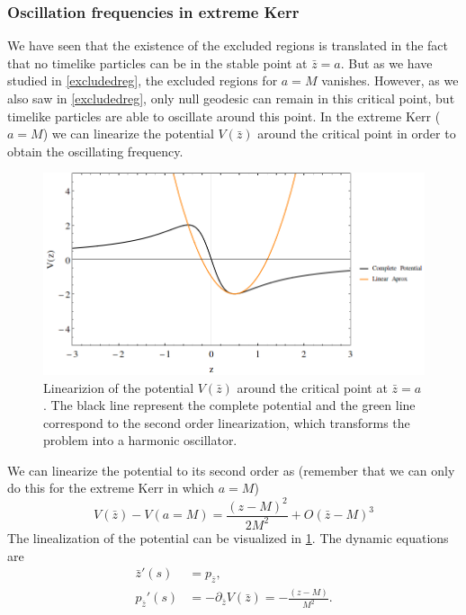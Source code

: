 \subsubsection{Oscillation frequencies in extreme Kerr}
\FloatBarrier
We have seen that the existence of the excluded regions is translated in the fact that no timelike particles can be in the stable point at $\bar z=a$. But as we have studied in \cref{excludedreg}, the excluded regions for $a=M$ vanishes. However, as we also saw in \cref{excludedreg}, only null geodesic can remain in this critical point, but timelike particles are able to oscillate around this point. In the extreme Kerr ($a=M$) we can linearize the potential $V(\bar z)$ around the critical point in order to obtain the oscillating frequency.
 \begin{figure}[b!]
\begin{center}
 \centerline{\includegraphics[width=\textwidth]{img/Chapter3/Lineal.png}}
 \end{center}
 \caption{Linearizion of the potential $V(\bar z)$ around the critical point at $\bar z =a$. The black line represent the complete potential and the green line correspond to the second order linearization, which transforms the problem into a harmonic oscillator.}
 \label{fig:2}
\end{figure}  
We can linearize the potential to its second order as (remember that we can only do this for the extreme Kerr in which $a=M$)
\begin{equation}
 V( \bar z) - V(a=M)=\frac{ (z-M)^2}{2 M^2} +O(\bar z-M)^3  
\end{equation}
The linealization of the potential can be visualized in \cref{fig:2}. The dynamic equations are
\begin{align}
 \bar{z}'(s)&=p_{\bar{z}}, \\
 p_{\bar{z}}'(s)&=- \partial_{\bar{z}} V(\bar{z})=-\frac{(z-M)}{M^2}.
\end{align}
